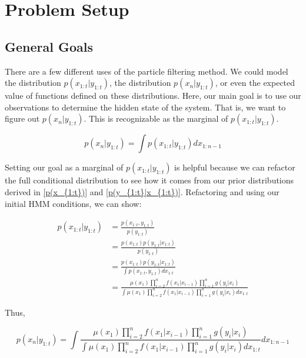 \documentclass{article}
\begin{document}
\section{Problem Setup}
\subsection{General Goals}
There are a few different uses of the particle filtering method. We could model the distribution $p(x_{1:t}|y_{1:t})$, the distribution $p(x_n|y_{1:t})$, or even the expected value of functions defined on these distributions. Here, our main goal is to use our observations to determine the hidden state of the system. That is, we want to figure out $p(x_{n}|y_{1:t})$. This is recognizable as the marginal of $p(x_{1:t}|y_{1:t})$.

\begin{equation}
p(x_{n}|y_{1:t}) = \int p(x_{1:t}|y_{1:t}) dx_{1:n-1}
\end{equation}

Setting our goal as a marginal of $p(x_{1:t}|y_{1:t})$ is helpful because we can refactor the full conditional distribution to see how it comes from our prior distributions derived in \eqref{p(x_{1:t})} and \eqref{p(y_{1:t}|x_{1:t})}. Refactoring and using our initial HMM conditions, we can show:

\begin{equation} \label{pfiltereq}
\begin{split}
p(x_{1:t}|y_{1:t}) &= \frac{p(x_{1:t},y_{1:t})}{p(y_{1:t})}\\
&= \frac{p(x_{1:t}) p(y_{1:t}|x_{1:t})}{p(y_{1:t})}\\
&= \frac{p(x_{1:t}) p(y_{1:t}|x_{1:t})}{\int p(x_{1:t},y_{1:t}) dx_{1:t}}\\
&= \frac{\mu(x_1)\prod_{i=2}^{n} f(x_1|x_{i-1})\prod_{i=1}^{n} g(y_i|x_i)}{\int \mu(x_1)\prod_{i=2}^{n} f(x_1|x_{i-1})\prod_{i=1}^{n} g(y_i|x_i) dx_{1:t}}
\end{split}
\end{equation}

\noindent
Thus,

\begin{equation} \label{monster}
p(x_n|y_{1:t}) = \int \frac{\mu(x_1)\prod_{i=2}^{n} f(x_1|x_{i-1})\prod_{i=1}^{n} g(y_i|x_i)}{\int \mu(x_1)\prod_{i=2}^{n} f(x_1|x_{i-1})\prod_{i=1}^{n} g(y_i|x_i) dx_{1:t}} dx_{1:n-1}
\end{equation}
\end{document}
